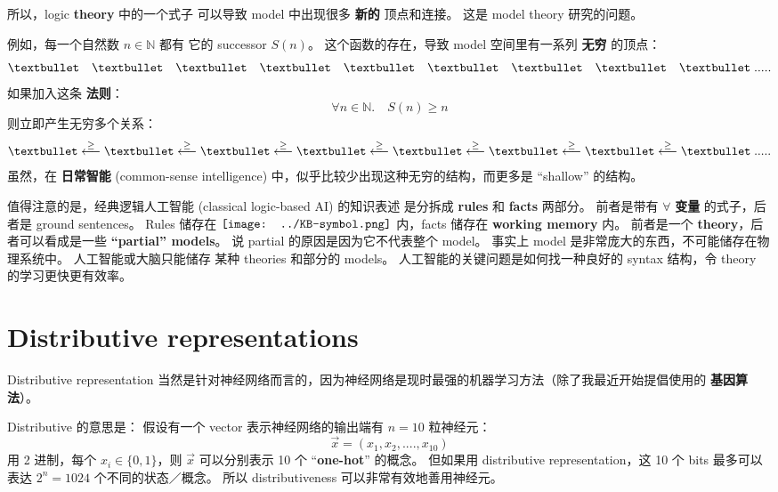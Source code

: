 \documentclass[12pt, orivec]{article}
\newcommand*\KB{\vcenter{\hbox{\texttt{[image: ../KB-symbol.png]}}}}
\begin{document}
所以，logic \textbf{theory} 中的一个式子 可以导致 model 中出现很多 \textbf{新的} 顶点和连接。 这是 model theory 研究的问题。

例如，每一个自然数 $n \in \mathbb{N}$ 都有 它的 successor $S(n)$。 这个函数的存在，导致 model 空间里有一系列 \textbf{无穷} 的顶点：
\begin{equation}
\textbullet \quad \textbullet \quad \textbullet \quad \textbullet \quad \textbullet \quad \textbullet \quad \textbullet \quad \textbullet \quad \textbullet \; .....
\end{equation}
如果加入这条 \textbf{法则}：
\begin{equation}
\forall n \in \mathbb{N}. \quad S(n) \ge n
\end{equation}
则立即产生无穷多个关系：
\begin{equation}
\textbullet \stackrel{\ge}{\longleftarrow} \textbullet \stackrel{\ge}{\longleftarrow} \textbullet \stackrel{\ge}{\longleftarrow} \textbullet \stackrel{\ge}{\longleftarrow} \textbullet \stackrel{\ge}{\longleftarrow} \textbullet \stackrel{\ge}{\longleftarrow} \textbullet \stackrel{\ge}{\longleftarrow} \textbullet \; .....
\end{equation}
虽然，在 \textbf{日常智能} (common-sense intelligence) 中，似乎比较少出现这种无穷的结构，而更多是 ``shallow'' 的结构。 

值得注意的是，经典逻辑人工智能 (classical logic-based AI) 的知识表述 是分拆成 \textbf{rules} 和 \textbf{facts} 两部分。 前者是带有 $\forall$ \textbf{变量} 的式子，后者是 ground sentences。  Rules 储存在 $\KB$ 内，facts 储存在 \textbf{working memory} 内。 前者是一个 \textbf{theory}，后者可以看成是一些 \textbf{``partial'' models}。  说 partial 的原因是因为它不代表整个 model。  事实上 model 是非常庞大的东西，不可能储存在物理系统中。  人工智能或大脑只能储存 某种 theories 和部分的 models。  人工智能的关键问题是如何找一种良好的 syntax 结构，令 theory 的学习更快更有效率。 

\section{Distributive representations}

Distributive representation 当然是针对神经网络而言的，因为神经网络是现时最强的机器学习方法（除了我最近开始提倡使用的 \textbf{基因算法}）。

Distributive 的意思是： 假设有一个 vector 表示神经网络的输出端有 $n = 10$ 粒神经元：
\begin{equation}
\vec{x} = (x_1, x_2, .... , x_{10})
\end{equation}
用 2 进制，每个 $x_i \in \{ 0, 1 \}$，则 $\vec{x}$ 可以分别表示 10 个 ``\textbf{one-hot}'' 的概念。  但如果用 distributive representation，这 10 个 bits 最多可以表达 $2^n = 1024$ 个不同的状态／概念。  所以 distributiveness 可以非常有效地善用神经元。
\end{document}
